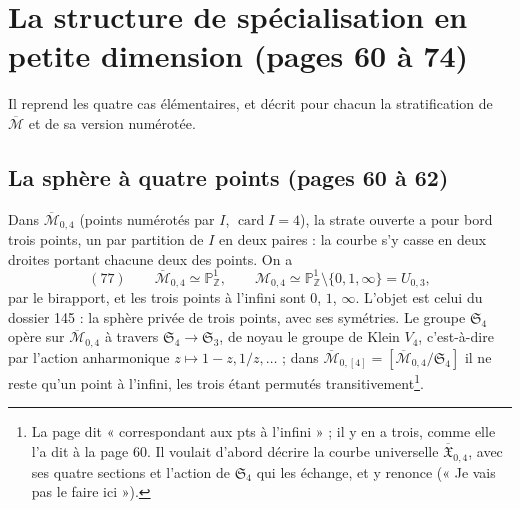 \documentclass[11pt,a4paper]{article}
\begin{document}
\section*{La structure de spécialisation en petite dimension (pages 60 à 74)}

Il reprend les quatre cas élémentaires, et décrit pour chacun la stratification
de $\overline{\mathcal{M}}$ et de sa version numérotée.

\subsection*{La sphère à quatre points (pages 60 à 62)}

Dans $\overline{\mathcal{M}}_{0,4}$ (points numérotés par $I$, $\operatorname{card}
I = 4$), la strate ouverte a pour bord trois points, un par partition de $I$ en
deux paires : la courbe s'y casse en deux droites portant chacune deux des
points. On a
\[
(77) \qquad \overline{\mathcal{M}}_{0,4} \simeq \mathbb{P}^1_{\mathbb{Z}}, \qquad
\mathcal{M}_{0,4} \simeq \mathbb{P}^1_{\mathbb{Z}} \setminus \{0, 1, \infty\}
= U_{0,3},
\]
par le birapport, et les trois points à l'infini sont $0$, $1$, $\infty$.
L'objet est celui du dossier 145 : la sphère privée de trois points, avec ses
symétries. Le groupe $\mathfrak{S}_4$ opère sur $\overline{\mathcal{M}}_{0,4}$ à
travers $\mathfrak{S}_4 \to \mathfrak{S}_3$, de noyau le groupe de Klein $V_4$,
c'est-à-dire par l'action anharmonique $z \mapsto 1 - z, 1/z, \dots$ ; dans
$\overline{\mathcal{M}}_{0,[4]} = [\overline{\mathcal{M}}_{0,4}/\mathfrak{S}_4]$
il ne reste qu'un point à l'infini, les trois étant permutés
transitivement\footnote{La page dit « correspondant aux  pts à
l'infini » ; il y en a trois, comme elle l'a dit à la page 60. Il voulait
d'abord décrire la courbe universelle $\overline{\mathfrak{X}}_{0,4}$, avec ses
quatre sections et l'action de $\mathfrak{S}_4$ qui les échange, et y renonce
(« Je vais pas le faire ici »).}.
\end{document}
